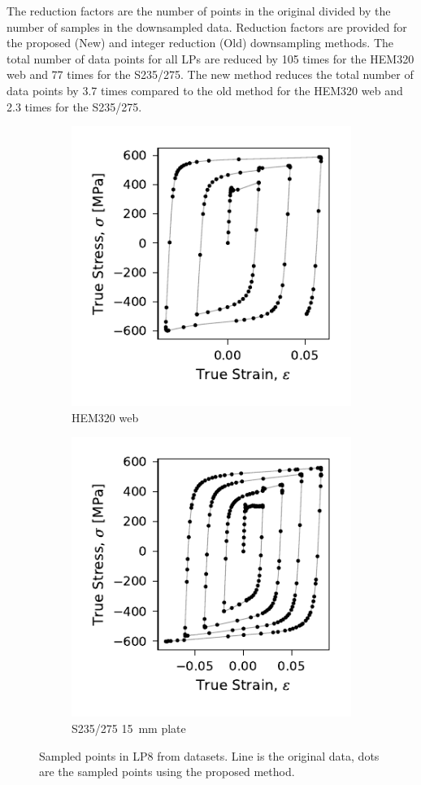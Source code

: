 \documentclass[a4paper,11pt]{article}
\begin{document}
The reduction factors are the number of points in the original divided by the number of samples in the downsampled data.
Reduction factors are provided for the proposed (New) and integer reduction (Old) downsampling methods.
The total number of data points for all LPs are reduced by 105 times for the HEM320 web and 77 times for the S235/275.
The new method reduces the total number of data points by 3.7 times compared to the old method for the HEM320 web and 2.3 times for the S235/275.


\begin{figure}
    \centering
    \begin{subfigure}[b]{0.49\linewidth}
        \centering
        \includegraphics{LP8_dots_WP3_HEM320_C_CRM20.pdf}
        \caption{HEM320 web}
        \label{fig:hem320-lp8-results}
    \end{subfigure}
    \begin{subfigure}[b]{0.49\linewidth}
        \centering
        \includegraphics{LP8_dots_S235275_Plate15.pdf}
        \caption{S235/275 15~mm plate}
        \label{fig:s235275-lp8-results}
    \end{subfigure}
    \caption{Sampled points in LP8 from datasets. Line is the original data, dots are the sampled points using the proposed method.}
    \label{fig:sampled-compare-dots}
\end{figure}
\end{document}
